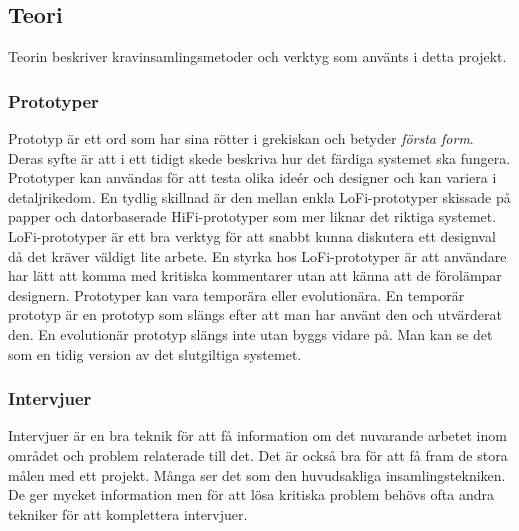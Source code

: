 \subsection{Teori}
Teorin beskriver kravinsamlingsmetoder och  verktyg som använts i detta projekt. %

\subsubsection{Prototyper}
Prototyp är ett ord som har sina rötter i grekiskan och betyder \textit{första form}\cite{Arvola}. Deras syfte är att i ett tidigt skede beskriva hur det färdiga systemet ska fungera. Prototyper kan användas för att testa olika ideér och designer och kan variera i detaljrikedom. En tydlig skillnad är den mellan enkla LoFi-prototyper skissade på papper och datorbaserade HiFi-prototyper som mer liknar det riktiga systemet. LoFi-prototyper är ett bra verktyg för att snabbt kunna diskutera ett designval då det kräver väldigt lite arbete. En styrka hos LoFi-prototyper är att användare har lätt att komma med kritiska kommentarer utan att känna att de förolämpar designern\cite{Arvola}.
Prototyper kan vara temporära eller evolutionära\cite{Arvola}. En temporär prototyp är en prototyp som slängs efter att man har använt den och utvärderat den. En evolutionär prototyp slängs inte utan byggs vidare på. Man kan se det som en tidig version av det slutgiltiga systemet.

\subsubsection{Intervjuer}
Intervjuer är en bra teknik för att få information om det nuvarande arbetet inom området och problem relaterade till det. Det är också bra för att få fram de stora målen med ett projekt. Många ser det som den huvudsakliga insamlingstekniken. De ger mycket information men för att lösa kritiska problem behövs ofta andra tekniker för att komplettera intervjuer. \cite{Lauesen}
